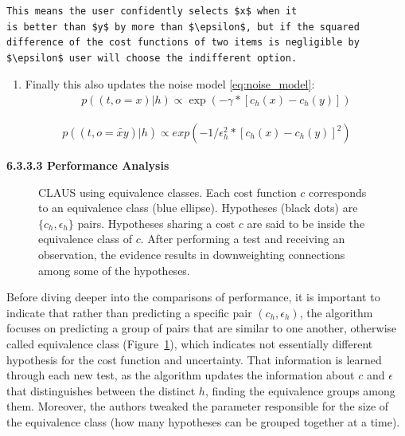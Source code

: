 \documentclass[
  letterpaper,
  numbers=noenddot,
  DIV=11,
  oneside]{scrreprt}
\providecommand{\tightlist}{%
  \setlength{\itemsep}{0pt}\setlength{\parskip}{0pt}}\usepackage{longtable,booktabs,array}
\theoremstyle{remark}
\begin{document}
\begin{verbatim}
This means the user confidently selects $x$ when it
is better than $y$ by more than $\epsilon$, but if the squared
difference of the cost functions of two items is negligible by
$\epsilon$ user will choose the indifferent option.
\end{verbatim}

\begin{enumerate}
\def\labelenumi{\arabic{enumi}.}
\setcounter{enumi}{2}
\tightlist
\item
  Finally this also updates the noise model
  \hyperref[eq:noise_model]{{[}eq:noise\_model{]}}: \[\begin{aligned}
  p((t, o = x) | h) \propto \exp(-\gamma * [c_h(x) - c_h(y)])
  \end{aligned}\]
\end{enumerate}

\[\begin{aligned}
    p((t, o = \tilde{xy}) | h) \propto exp(-1/\epsilon_h^2 * [c_h(x) - c_h(y)]^2)
\end{aligned}\]

\textbf{6.3.3.3 Performance Analysis}

\begin{figure}


\caption{\label{fig-equiv_c}CLAUS using equivalence classes. Each cost
function \(c\) corresponds to an equivalence class (blue ellipse).
Hypotheses (black dots) are \(\{c_h,\epsilon_h\}\) pairs. Hypotheses
sharing a cost \(c\) are said to be inside the equivalence class of
\(c\). After performing a test and receiving an observation, the
evidence results in downweighting connections among some of the
hypotheses.}

\end{figure}%

Before diving deeper into the comparisons of performance, it is
important to indicate that rather than predicting a specific pair
\((c_h, \epsilon_h)\), the algorithm focuses on predicting a group of
pairs that are similar to one another, otherwise called equivalence
class (Figure~\ref{fig-equiv_c}), which indicates not essentially
different hypothesis for the cost function and uncertainty. That
information is learned through each new test, as the algorithm updates
the information about \(c\) and \(\epsilon\) that distinguishes between
the distinct \(h\), finding the equivalence groups among them. Moreover,
the authors tweaked the parameter responsible for the size of the
equivalence class (how many hypotheses can be grouped together at a
time).
\end{document}
